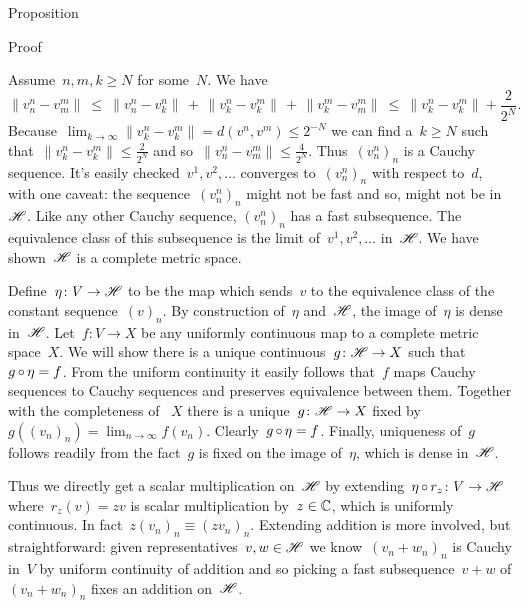 \begin{parsec}
\begin{point}{Proposition}
\begin{point}{Proof}
\begin{point}
Assume~$n,m,k \geq N$ for some~$N$.  We have
\begin{equation*}
    \| v^n_n - v^m_m \|
       \  \leq \ 
    \| v^n_n - v^n_k \| \,+\,
    \| v^n_k - v^m_k \| \,+\,
    \| v^m_k - v^m_m \|\  \leq \ 
    \| v^n_k - v^m_k \|+ \frac{2}{2^N}.
\end{equation*}
Because~$\lim_{k\to\infty} \|v_k^n-v_k^m \| =d(v^n,v^m) \leq 2^{-N}$
    we can find a~$k \geq N$
    such that~$\| v^n_k - v^m_k \| \leq \frac{2}{2^N}$
    and so~$\|v^n_n - v^m_m\| \leq \frac{4}{2^N}$.
    Thus~$(v^n_n)_n$ is a Cauchy sequence.
It's easily checked~$v^1, v^2, \ldots$
converges to~$(v^n_n)_n$ with respect to~$d$,
with one caveat: the sequence~$(v^n_n)_n$ might not be fast
    and so, might not be in~$\mathscr{H}$.
Like any other Cauchy sequence, $(v^n_n)_n$
    has a fast subsequence.
The equivalence class
    of this subsequence is the limit of~$v^1, v^2, \ldots$ in~$\mathscr{H}$.
We have shown~$\mathscr{H}$ is a complete metric space.
\end{point}
\begin{point}[prop-hilbert-space-completion-extension]%
Define~$\eta\colon V \to \mathscr{H}$
    to be the map which sends~$v$ to the equivalence class of the
    constant sequence~$(v)_n$.
By construction of~$\eta$ and~$\mathscr{H}$,
    the image of~$\eta$ is dense in~$\mathscr{H}$.
Let~$f\colon V \to X$
    be any uniformly continuous map to a complete metric space~$X$.
We will show there is a unique continuous~$g\colon \mathscr{H} \to X$
    such that~$g \mathop{\circ} \eta = f$.
From the uniform continuity it easily follows
    that~$f$ maps Cauchy sequences to Cauchy sequences
    and preserves equivalence between them.
Together with the completeness of ~$X$
    there is a unique~$g\colon \mathscr{H} \to X$
    fixed by~$g((v_n)_n) = \lim_{n\to\infty}f(v_n)$.
Clearly~$g \mathop{\circ} \eta = f$.
Finally, uniqueness of~$g$ follows readily from
    the fact~$g$ is fixed on the image of~$\eta$,
    which is dense in~$\mathscr{H}$.
\end{point}
\begin{point}%
Thus we directly get a scalar multiplication
    on~$\mathscr{H}$ by extending~$\eta \mathop{\circ} r_z \colon V \to \mathscr{H}$
    where~$r_z(v) = zv$ is scalar multiplication by~$z \in \mathbb{C}$,
    which is uniformly continuous.
In fact~$z (v_n)_n \equiv (z v_n)_n$.
Extending addition is more involved, but straightforward:
    given representatives~$v,w \in \mathscr{H}$
    we know~$(v_n+w_n)_n$ is Cauchy in~$V$
    by uniform continuity of addition and so
    picking a fast subsequence~$v+w$ of $(v_n+w_n)_n$
        fixes an addition on~$\mathscr{H}$.

\end{point}
\end{point}
\end{point}
\end{parsec}
